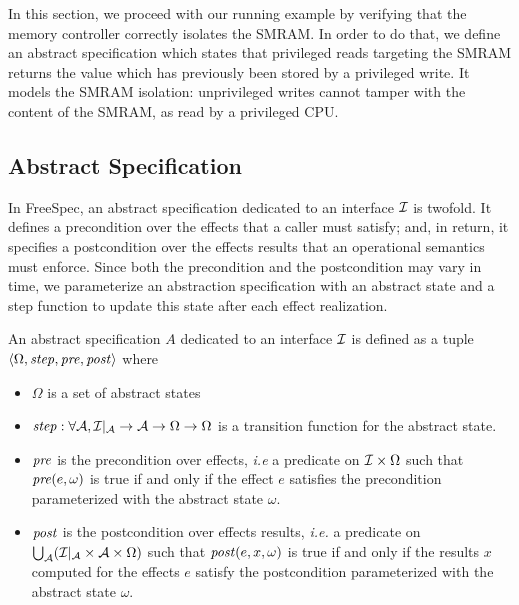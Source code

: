 In this section, we proceed with our running example by verifying that the
memory controller correctly isolates the SMRAM.
%
In order to do that, we define an abstract specification which states that
privileged reads targeting the SMRAM returns the value which has previously been
stored by a privileged write. It models the SMRAM isolation: unprivileged writes
cannot tamper with the content of the SMRAM, as read by a privileged CPU.

\subsection{Abstract Specification}

In FreeSpec, an abstract specification dedicated to an interface $\mathcal{I}$ is
twofold.
%
It defines a precondition over the effects that a caller must satisfy; and, in
return, it specifies a postcondition over the effects results that an
operational semantics must enforce.
%
Since both the precondition and the postcondition may vary in time, we
parameterize an abstraction specification with an abstract state and a step
function to update this state after each effect realization.

\begin{definition} \label{def:freespec:abstract-specs}
  An abstract specification $A$ dedicated to an interface $\mathcal{I}$ is defined as a
  tuple $\langle \Omega, \mathit{step}, \mathit{pre}, \mathit{post} \rangle$ where
  \begin{itemize}
  \item $\Omega$ is a set of abstract states
  \item
    $\mathit{step} : \forall \mathcal{A}, \mathcal{I}|_{\mathcal{A}} \rightarrow
    \mathcal{A} \rightarrow \Omega \rightarrow \Omega$ is a transition function
    for the abstract state.
  \item $\mathit{pre}$ is the precondition over effects, \emph{i.e} a predicate on
    $\mathcal{I} \times \Omega$ such that $\mathit{pre}(e, \omega)$ is true if and only if
    the effect $e$ satisfies the precondition parameterized with the abstract
    state $\omega$.
  \item $\mathit{post}$ is the postcondition over effects results, \emph{i.e.} a
    predicate on
    $\bigcup_{\mathcal{A}} (\mathcal{I}|_{\mathcal{A}} \times \mathcal{A}
    \times \Omega)$ such that $\mathit{post}(e, x, \omega)$ is true if and only if
    the results $x$ computed for the effects $e$ satisfy the postcondition
    parameterized with the abstract state $\omega$.
  \end{itemize}
\end{definition}

